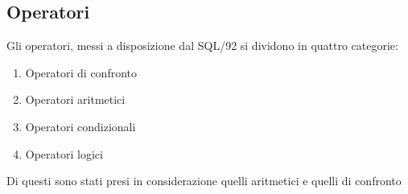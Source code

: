 \subsection{Operatori}
Gli operatori, messi a disposizione dal SQL/92 si dividono in quattro categorie:
\begin{enumerate}
\item Operatori di confronto
\item Operatori aritmetici
\item Operatori condizionali
\item Operatori logici
\end{enumerate}
Di questi sono stati presi in considerazione quelli aritmetici e quelli di confronto 